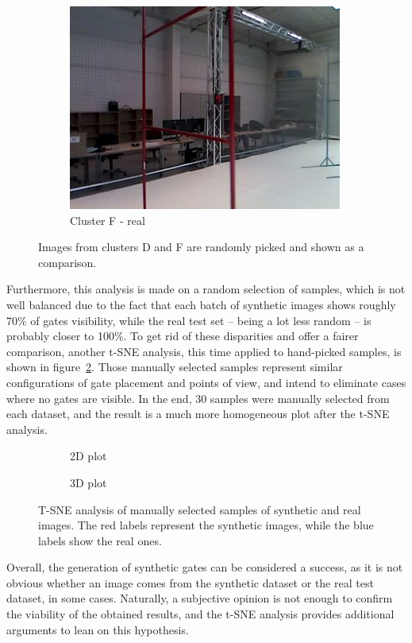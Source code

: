 \begin{figure}[h!]
\begin{subfigure}{0.29\textwidth}
      \includegraphics[width=\textwidth]{figure/tsne_random/F/6.png}
      \caption{Cluster F - real}
   \end{subfigure}
   \caption[Synthetic versus real images comparison]{Images from clusters D and
   F are randomly picked and shown as a comparison.}
   \label{fig:clustering}
\end{figure}

Furthermore, this analysis is made on a random selection of samples, which is
not well balanced due to the fact that each batch of synthetic images shows
roughly 70\% of gates visibility, while the real test set -- being a lot less
random -- is probably closer to 100\%. To get rid of these disparities and
offer a fairer comparison, another t-SNE analysis, this time applied to
hand-picked samples, is shown in figure~\ref{fig:tsne-manual}. Those manually
selected samples represent similar configurations of gate placement and
points of view, and intend to eliminate cases where no gates are visible. In
the end, 30 samples were manually selected from each dataset, and the result is
a much more homogeneous plot after the t-SNE analysis.

\begin{figure}[h!]
	\centering
	\begin{subfigure}[h]{0.49\textwidth}
		\scalebox{0.4}{
			
		}
		\caption{2D plot}
	\end{subfigure}
	\begin{subfigure}[h]{0.49\textwidth}
		\scalebox{0.4}{
			
		}
		\caption{3D plot}
	\end{subfigure}
	\caption[T-SNE analysis of hand-picked samples.]{T-SNE analysis of
	manually selected samples of synthetic and real images. The red labels
	represent the synthetic images, while the blue labels show the real ones.}
	\label{fig:tsne-manual}
\end{figure}

Overall, the generation of synthetic gates can be considered a success, as
it is not obvious whether an image comes from the synthetic dataset or the real
test dataset, in some cases. Naturally, a subjective opinion is not enough to
confirm the viability of the obtained results, and the t-SNE analysis provides
additional arguments to lean on this hypothesis.
\clearpage

